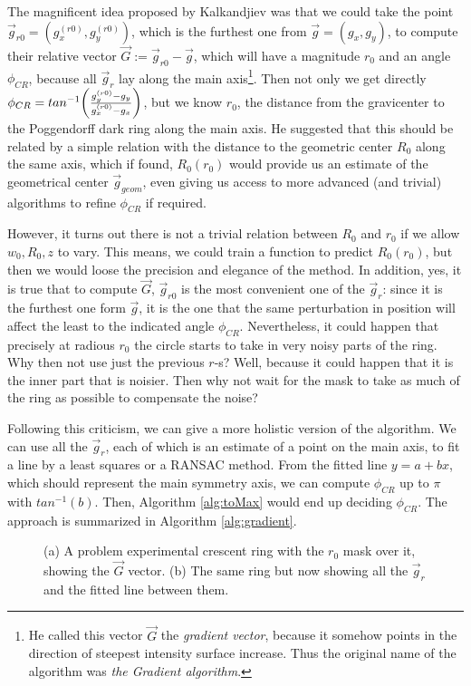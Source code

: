 \documentclass[11pt, a4paper, twoside]{article} %
\begin{document}
The magnificent idea proposed by Kalkandjiev was that we could take the point $\vec{g}_{r0}=(g_x^{(r0)}, g_y^{(r0)})$, which is the furthest one from $\vec{g}=(g_x,g_y)$, to compute their relative vector $\vec{G}:=\vec{g}_{r0}-\vec{g}$, which will have a magnitude $r_0$ and an angle $\phi_{CR}$, because all $\vec{g}_r$ lay along the main axis\footnote{He called this vector $\vec{G}$ the {\em gradient vector}, because it somehow points in the direction of steepest intensity surface increase. Thus the original name of the algorithm was {\em the Gradient algorithm}.}. Then not only we get directly $\phi_{CR}=tan^{-1}\qty(\frac{g_y^{(r0)}-g_y}{g_x^{(r0)}-g_x})$, but we know $r_0$, the distance from the gravicenter to the Poggendorff dark ring along the main axis. He suggested that this should be related by a simple relation with the distance to the geometric center $R_0$ along the same axis, which if found, $R_0(r_0)$ would provide us an estimate of the geometrical center $\vec{g}_{geom}$, even giving us access to more advanced (and trivial) algorithms to refine $\phi_{CR}$ if required.

However, it turns out there is not a trivial relation between $R_0$ and $r_0$ if we allow $w_0,R_0,z$ to vary. This means, we could train a function to predict $R_0(r_0)$, but then we would loose the precision and elegance of the method. In addition, yes, it is true that to compute $\vec{G}$, $\vec{g}_{r0}$ is the most convenient one of the $\vec{g}_r$: since it is the furthest one form $\vec{g}$, it is the one that the same perturbation in position will affect the least to the indicated angle $\phi_{CR}$. Nevertheless, it could happen that precisely at radious $r_0$ the circle starts to take in very noisy parts of the ring. Why then not use just the previous $r$-s? Well, because it could happen that it is the inner part that is noisier. Then why not wait for the mask to take as much of the ring as possible to compensate the noise?

Following this criticism, we can give a more holistic version of the algorithm. We can use all the $\vec{g}_r$, each of which is an estimate of a point on the main axis, to fit a line by a least squares or a RANSAC \cite{RANSAC} method. From the fitted line $y=a+bx$, which should represent the main symmetry axis, we can compute $\phi_{CR}$ up to $\pi$ with $tan^{-1}(b)$. Then, Algorithm \ref{alg:toMax} would end up deciding $\phi_{CR}$. The approach is summarized in Algorithm \ref{alg:gradient}.

\begin{figure}[h!] 
     \centering 
    \caption{(a) A problem experimental crescent ring with the $r_0$ mask over it, showing the $\vec{G}$ vector. (b) The same ring but now showing all the $\vec{g}_r$ and the fitted line between them.}
    \label{fig:grav}
\end{figure}
\end{document}
